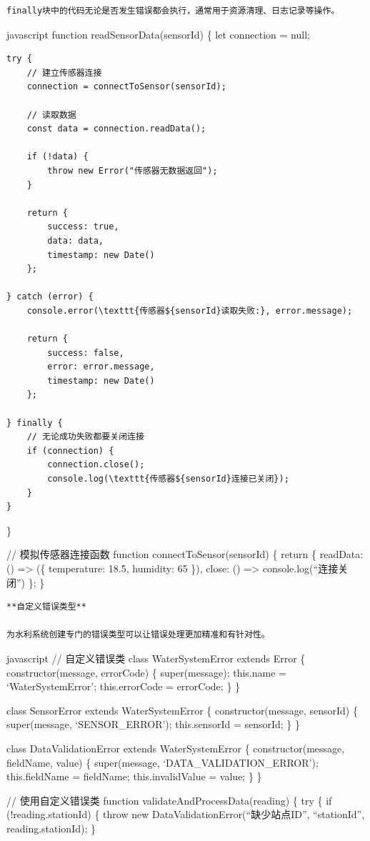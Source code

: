 {\begin{lstlisting}
finally块中的代码无论是否发生错误都会执行，通常用于资源清理、日志记录等操作。
\end{lstlisting}

javascript function readSensorData(sensorId) \{ let connection = null;

\begin{verbatim}
try {
    // 建立传感器连接
    connection = connectToSensor(sensorId);
    
    // 读取数据
    const data = connection.readData();
    
    if (!data) {
        throw new Error("传感器无数据返回");
    }
    
    return {
        success: true,
        data: data,
        timestamp: new Date()
    };
    
} catch (error) {
    console.error(\texttt{传感器${sensorId}读取失败:}, error.message);
    
    return {
        success: false,
        error: error.message,
        timestamp: new Date()
    };
    
} finally {
    // 无论成功失败都要关闭连接
    if (connection) {
        connection.close();
        console.log(\texttt{传感器${sensorId}连接已关闭});
    }
}
\end{verbatim}

\}

// 模拟传感器连接函数 function connectToSensor(sensorId) \{ return \{ readData: () =\textgreater{} (\{ temperature: 18.5, humidity: 65 \}), close: () =\textgreater{} console.log(``连接关闭'') \}; \}

\begin{lstlisting}
**自定义错误类型**

为水利系统创建专门的错误类型可以让错误处理更加精准和有针对性。
\end{lstlisting}

javascript // 自定义错误类 class WaterSystemError extends Error \{ constructor(message, errorCode) \{ super(message); this.name = `WaterSystemError'; this.errorCode = errorCode; \} \}

class SensorError extends WaterSystemError \{ constructor(message, sensorId) \{ super(message, `SENSOR\_ERROR'); this.sensorId = sensorId; \} \}

class DataValidationError extends WaterSystemError \{ constructor(message, fieldName, value) \{ super(message, `DATA\_VALIDATION\_ERROR'); this.fieldName = fieldName; this.invalidValue = value; \} \}

// 使用自定义错误类 function validateAndProcessData(reading) \{ try \{ if (!reading.stationId) \{ throw new DataValidationError(``缺少站点ID'', ``stationId'', reading.stationId); \}

}
